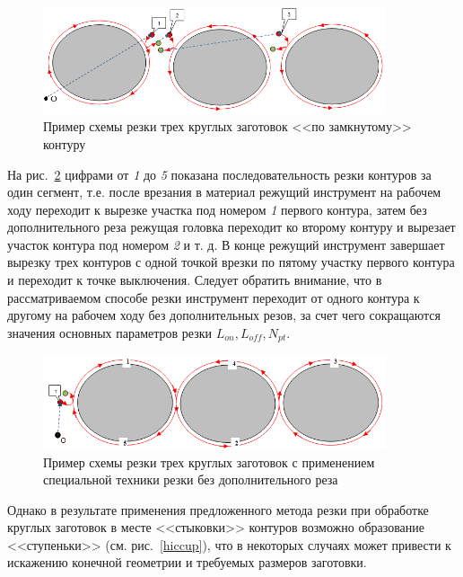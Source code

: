 \documentclass[11pt,twoside,openany]{report}
\begin{document}
\begin{figure}[h]
  \begin{center}
  \includegraphics[width=0.9\textwidth]{3-3.png}
  \caption{Пример схемы резки трех круглых заготовок <<по замкнутому>> контуру}
  \label{3-3}
  \end{center}
\end{figure}

На рис.~\ref{3-1}
цифрами от {\it 1} до {\it 5} показана последовательность
резки контуров за один сегмент,
т.е. после врезания в материал режущий инструмент
на рабочем ходу переходит к вырезке участка
под номером {\it 1} первого контура,
затем без дополнительного реза режущая головка
переходит ко второму контуру и вырезает участок
контура под номером {\it 2} и т. д.
В конце режущий инструмент завершает
вырезку трех контуров с одной точкой
врезки по пятому участку первого контура и
переходит к точке выключения.
Следует обратить внимание, что в рассматриваемом
способе резки инструмент переходит от одного контура к
другому на рабочем ходу без дополнительных резов,
за счет чего сокращаются значения основных параметров резки
$L_{on}, L_{off}, N_{pt}$.

\begin{figure}[h]
  \begin{center}
  \includegraphics[width=0.9\textwidth]{3-1.png}
  \caption{Пример схемы резки трех круглых заготовок с применением специальной техники резки без дополнительного реза}
  \label{3-1}
  \end{center}
\end{figure}

Однако в результате применения предложенного метода
резки при обработке круглых заготовок в месте <<стыковки>>
контуров возможно образование <<ступеньки>>
(см. рис.~\ref{hiccup}),
что в некоторых случаях может привести к
искажению конечной геометрии и требуемых размеров заготовки.
\end{document}
